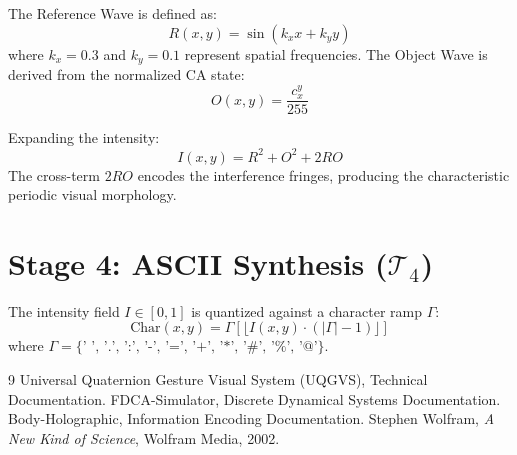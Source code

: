 \documentclass[11pt,a4paper]{article}
\begin{document}
The Reference Wave is defined as:
\[ R(x, y) = \sin(k_x x + k_y y) \]
where $k_x=0.3$ and $k_y=0.1$ represent spatial frequencies. The Object Wave is derived from the normalized CA state:
\[ O(x, y) = \frac{c_x^y}{255} \]

Expanding the intensity:
\[ I(x, y) = R^2 + O^2 + 2RO \]
The cross-term $2RO$ encodes the interference fringes, producing the characteristic periodic visual morphology.

\section{Stage 4: ASCII Synthesis ($\mathcal{T}_4$)}
The intensity field $I \in [0, 1]$ is quantized against a character ramp $\Gamma$:
\[ \text{Char}(x, y) = \Gamma \left[ \lfloor I(x, y) \cdot (|\Gamma|-1) \rfloor \right] \]
where $\Gamma = \{ \text{' ', '.', ':', '-', '=', '+', '*', '\#', '\%', '@'} \}$.

\begin{thebibliography}{9}
Universal Quaternion Gesture Visual System (UQGVS), Technical Documentation.
FDCA-Simulator, Discrete Dynamical Systems Documentation.
Body-Holographic, Information Encoding Documentation.
Stephen Wolfram, \textit{A New Kind of Science}, Wolfram Media, 2002.
\end{thebibliography}
\end{document}
